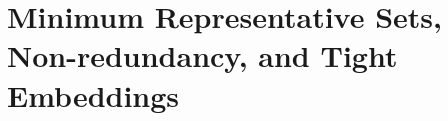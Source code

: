 \documentclass[12pt]{article}
\newcommand{\Comments}{1}
\newcommand{\mynote}[2]{\ifnum\Comments=1\textcolor{#1}{#2}\fi}
\newcommand{\raf}[1]{\mynote{darkgreen}{[RF: #1]}}
\newcommand{\reals}{\mathbb{R}}
\newcommand{\prop}[1]{\mathrm{prop}[#1]}
\newcommand{\simplex}{\Delta_\Y}
\newcommand{\R}{\mathcal{R}}
\newcommand{\Sc}{\mathcal{S}}
\newcommand{\Y}{\mathcal{Y}}
\newcommand{\risk}[1]{\underline{#1}}
\newcommand{\trim}{\mathrm{trim}}
\begin{document}
\section{Minimum Representative Sets, Non-redundancy, and Tight Embeddings}

\end{document}
